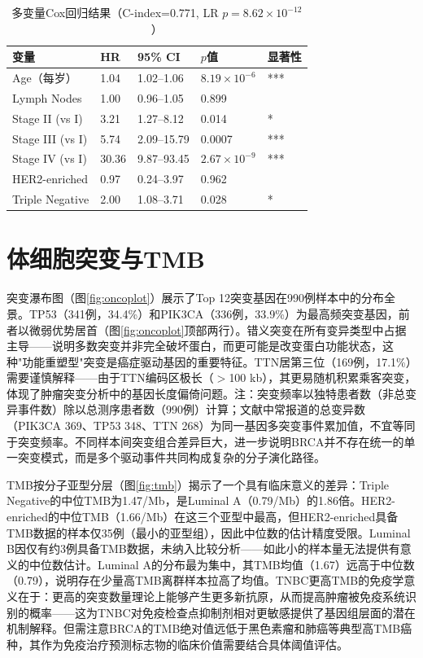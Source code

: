 \documentclass[12pt,a4paper,openany]{ctexbook}
\begin{document}
\begin{table}[H]
\centering\caption{多变量Cox回归结果（C-index=0.771, LR $p=8.62\times10^{-12}$）}\label{tab:cox}
\begin{tabular}{lllll}\toprule
变量 & HR & 95\% CI & $p$值 & 显著性 \\\midrule
Age（每岁） & 1.04 & 1.02--1.06 & $8.19\times10^{-6}$ & *** \\
Lymph Nodes & 1.00 & 0.96--1.05 & 0.899 & \\
Stage II (vs I) & 3.21 & 1.27--8.12 & 0.014 & * \\
Stage III (vs I) & 5.74 & 2.09--15.79 & 0.0007 & *** \\
Stage IV (vs I) & 30.36 & 9.87--93.45 & $2.67\times10^{-9}$ & *** \\
HER2-enriched & 0.97 & 0.24--3.97 & 0.962 & \\
Triple Negative & 2.00 & 1.08--3.71 & 0.028 & * \\\bottomrule
\end{tabular}
\end{table}

\section{体细胞突变与TMB}
突变瀑布图（图\ref{fig:oncoplot}）展示了Top 12突变基因在990例样本中的分布全景。TP53（341例，34.4\%）和PIK3CA（336例，33.9\%）为最高频突变基因，前者以微弱优势居首（图\ref{fig:oncoplot}顶部两行）。错义突变在所有变异类型中占据主导——说明多数突变并非完全破坏蛋白，而更可能是改变蛋白功能状态，这种"功能重塑型"突变是癌症驱动基因的重要特征。TTN居第三位（169例，17.1\%）需要谨慎解释——由于TTN编码区极长（$>$100 kb），其更易随机积累乘客突变，体现了肿瘤突变分析中的基因长度偏倚问题。注：突变频率以独特患者数（非总变异事件数）除以总测序患者数（990例）计算；文献中常报道的总变异数（PIK3CA 369、TP53 348、TTN 268）为同一基因多突变事件累加值，不宜等同于突变频率。不同样本间突变组合差异巨大，进一步说明BRCA并不存在统一的单一突变模式，而是多个驱动事件共同构成复杂的分子演化路径。

TMB按分子亚型分层（图\ref{fig:tmb}）揭示了一个具有临床意义的差异：Triple Negative的中位TMB为1.47/Mb，是Luminal A（0.79/Mb）的1.86倍。HER2-enriched的中位TMB（1.66/Mb）在这三个亚型中最高，但HER2-enriched具备TMB数据的样本仅35例（最小的亚型组），因此中位数的估计精度受限。Luminal B因仅有约3例具备TMB数据，未纳入比较分析——如此小的样本量无法提供有意义的中位数估计。Luminal A的分布最为集中，其TMB均值（1.67）远高于中位数（0.79），说明存在少量高TMB离群样本拉高了均值。TNBC更高TMB的免疫学意义在于：更高的突变数量理论上能够产生更多新抗原，从而提高肿瘤被免疫系统识别的概率——这为TNBC对免疫检查点抑制剂相对更敏感提供了基因组层面的潜在机制解释。但需注意BRCA的TMB绝对值远低于黑色素瘤和肺癌等典型高TMB癌种，其作为免疫治疗预测标志物的临床价值需要结合具体阈值评估。
\end{document}
